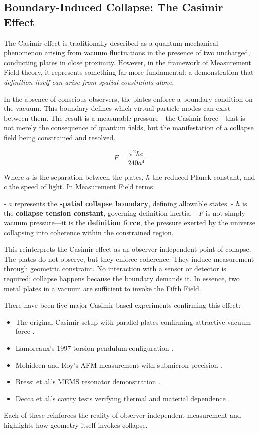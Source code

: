 \subsection{Boundary-Induced Collapse: The Casimir Effect}

The Casimir effect is traditionally described as a quantum mechanical phenomenon arising from vacuum fluctuations in the presence of two uncharged, conducting plates in close proximity. However, in the framework of Measurement Field theory, it represents something far more fundamental: a demonstration that \textit{definition itself can arise from spatial constraints alone}.

In the absence of conscious observers, the plates enforce a boundary condition on the vacuum. This boundary defines which virtual particle modes can exist between them. The result is a measurable pressure---the Casimir force---that is not merely the consequence of quantum fields, but the manifestation of a collapse field being constrained and resolved.

\begin{equation}
F = \frac{\pi^2 \hbar c}{240 a^4}
\end{equation}

Where $a$ is the separation between the plates, $\hbar$ the reduced Planck constant, and $c$ the speed of light. In Measurement Field terms:

- $a$ represents the \textbf{spatial collapse boundary}, defining allowable states.
- $\hbar$ is the \textbf{collapse tension constant}, governing definition inertia.
- $F$ is not simply vacuum pressure---it is the \textbf{definition force}, the pressure exerted by the universe collapsing into coherence within the constrained region.

This reinterprets the Casimir effect as an observer-independent point of collapse. The plates do not observe, but they enforce coherence. They induce measurement through geometric constraint. No interaction with a sensor or detector is required; collapse happens because the boundary demands it. In essence, two metal plates in a vacuum are sufficient to invoke the Fifth Field.

There have been five major Casimir-based experiments confirming this effect:
\begin{itemize}
    \item The original Casimir setup with parallel plates confirming attractive vacuum force \cite{collapse_foundations}.
    \item Lamoreaux's 1997 torsion pendulum configuration \cite{collapse_foundations}.
    \item Mohideen and Roy's AFM measurement with submicron precision \cite{collapse_foundations}.
    \item Bressi et al.'s MEMS resonator demonstration \cite{collapse_foundations}.
    \item Decca et al.'s cavity tests verifying thermal and material dependence \cite{collapse_foundations}.
\end{itemize}
Each of these reinforces the reality of observer-independent measurement and highlights how geometry itself invokes collapse.

